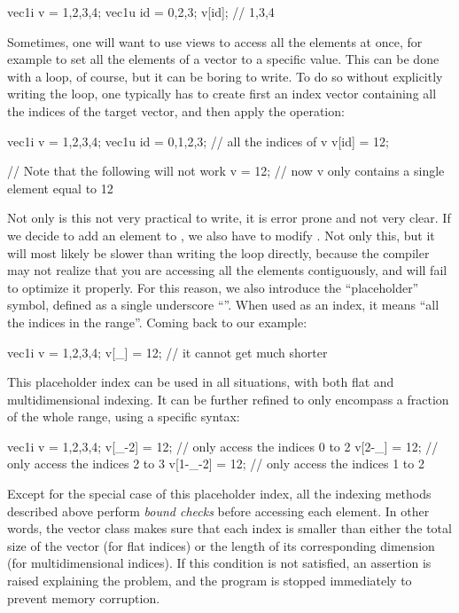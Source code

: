 \documentclass[12pt,a4paper]{report}
\newenvironment{example}
{
    \begin{mdframed}[style=example,frametitle={Example}]
}
{
    \end{mdframed}
}
\begin{document}
\begin{example}
\begin{cppcode}
vec1i v = {1,2,3,4};
vec1u id = {0,2,3};
v[id]; // 1,3,4
\end{cppcode}
\end{example}

Sometimes, one will want to use views to access all the elements at once, for example to set all the elements of a vector to a specific value. This can be done with a loop, of course, but it can be boring to write. To do so without explicitly writing the loop, one typically has to create first an index vector containing all the indices of the target vector, and then apply the operation:

\begin{cppcode}
vec1i v = {1,2,3,4};
vec1u id = {0,1,2,3}; // all the indices of v
v[id] = 12;

// Note that the following will not work
v = 12; // now v only contains a single element equal to 12
\end{cppcode}

Not only is this not very practical to write, it is error prone and not very clear. If we decide to add an element to , we also have to modify . Not only this, but it will most likely be slower than writing the loop directly, because the compiler may not realize that you are accessing all the elements contiguously, and will fail to optimize it properly. For this reason, we also introduce the ``placeholder'' symbol, defined as a single underscore ``\cppinline{_}''. When used as an index, it means ``all the indices in the range''. Coming back to our example:

\begin{cppcode}
vec1i v = {1,2,3,4};
v[_] = 12; // it cannot get much shorter
\end{cppcode}

This placeholder index can be used in all situations, with both flat and multidimensional indexing. It can be further refined to only encompass a fraction of the whole range, using a specific syntax:

\begin{cppcode}
vec1i v = {1,2,3,4};
v[_-2] = 12;   // only access the indices 0 to 2
v[2-_] = 12;   // only access the indices 2 to 3
v[1-_-2] = 12; // only access the indices 1 to 2
\end{cppcode}

Except for the special case of this placeholder index, all the indexing methods described above perform \emph{bound checks} before accessing each element. In other words, the vector class makes sure that each index is smaller than either the total size of the vector (for flat indices) or the length of its corresponding dimension (for multidimensional indices). If this condition is not satisfied, an assertion is raised explaining the problem, and the program is stopped immediately to prevent memory corruption.
\end{document}
